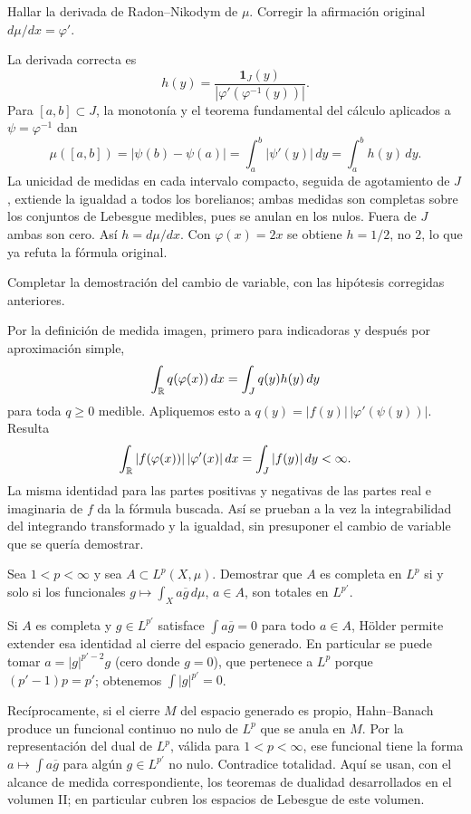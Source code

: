\begin{ejercicio}\label{ej:v4-l02-3}
Hallar la derivada de Radon--Nikodym de $\mu$. Corregir la afirmación original $d\mu/dx=\varphi'$.
\end{ejercicio}
\begin{solucion}
La derivada correcta es
\[
 h(y)=\frac{\mathbf1_J(y)}{|\varphi'(\varphi^{-1}(y))|}.
\]
Para $[a,b]\subset J$, la monotonía y el teorema fundamental del cálculo aplicados a $\psi=\varphi^{-1}$ dan
\[
 \mu([a,b])=|\psi(b)-\psi(a)|=\int_a^b|\psi'(y)|\,dy=\int_a^b h(y)\,dy.
\]
La unicidad de medidas en cada intervalo compacto, seguida de agotamiento de $J$, extiende la igualdad a todos los borelianos; ambas medidas son completas sobre los conjuntos de Lebesgue medibles, pues se anulan en los nulos. Fuera de $J$ ambas son cero. Así $h=d\mu/dx$. Con $\varphi(x)=2x$ se obtiene $h=1/2$, no $2$, lo que ya refuta la fórmula original.
\end{solucion}

\begin{ejercicio}\label{ej:v4-l02-4}
Completar la demostración del cambio de variable, con las hipótesis corregidas anteriores.
\end{ejercicio}
\begin{solucion}
Por la definición de medida imagen, primero para indicadoras y después por aproximación simple,
\[
 \int_\mathbb R q(\varphi(x))\,dx=\int_J q(y)h(y)\,dy
\]
para toda $q\geq0$ medible. Apliquemos esto a $q(y)=|f(y)|\,|\varphi'(\psi(y))|$. Resulta
\[
 \int_\mathbb R |f(\varphi(x))|\,|\varphi'(x)|\,dx=\int_J|f(y)|\,dy<\infty.
\]
La misma identidad para las partes positivas y negativas de las partes real e imaginaria de $f$ da la fórmula buscada. Así se prueban a la vez la integrabilidad del integrando transformado y la igualdad, sin presuponer el cambio de variable que se quería demostrar.
\end{solucion}

\begin{ejercicio}\label{ej:v4-l03-1}
Sea $1<p<\infty$ y sea $A\subset L^p(X,\mu)$. Demostrar que $A$ es completa en $L^p$ si y solo si los funcionales $g\mapsto\int_X a\overline g\,d\mu$, $a\in A$, son totales en $L^{p'}$.
\end{ejercicio}
\begin{solucion}
Si $A$ es completa y $g\in L^{p'}$ satisface $\int a\overline g=0$ para todo $a\in A$, Hölder permite extender esa identidad al cierre del espacio generado. En particular se puede tomar $a=|g|^{p'-2}g$ (cero donde $g=0$), que pertenece a $L^p$ porque $(p'-1)p=p'$; obtenemos $\int|g|^{p'}=0$.

Recíprocamente, si el cierre $M$ del espacio generado es propio, Hahn--Banach produce un funcional continuo no nulo de $L^p$ que se anula en $M$. Por la representación del dual de $L^p$, válida para $1<p<\infty$, ese funcional tiene la forma $a\mapsto\int a\overline g$ para algún $g\in L^{p'}$ no nulo. Contradice totalidad. Aquí se usan, con el alcance de medida correspondiente, los teoremas de dualidad desarrollados en el volumen II; en particular cubren los espacios de Lebesgue de este volumen.
\end{solucion}

